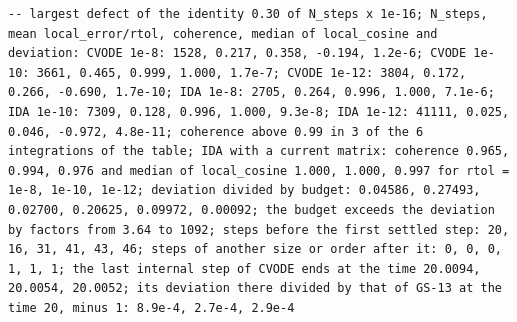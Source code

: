 \documentclass[
  10pt,
]{article}
\begin{document}
\begin{verbatim}
-- largest defect of the identity 0.30 of N_steps x 1e-16; N_steps, mean local_error/rtol, coherence, median of local_cosine and deviation: CVODE 1e-8: 1528, 0.217, 0.358, -0.194, 1.2e-6; CVODE 1e-10: 3661, 0.465, 0.999, 1.000, 1.7e-7; CVODE 1e-12: 3804, 0.172, 0.266, -0.690, 1.7e-10; IDA 1e-8: 2705, 0.264, 0.996, 1.000, 7.1e-6; IDA 1e-10: 7309, 0.128, 0.996, 1.000, 9.3e-8; IDA 1e-12: 41111, 0.025, 0.046, -0.972, 4.8e-11; coherence above 0.99 in 3 of the 6 integrations of the table; IDA with a current matrix: coherence 0.965, 0.994, 0.976 and median of local_cosine 1.000, 1.000, 0.997 for rtol = 1e-8, 1e-10, 1e-12; deviation divided by budget: 0.04586, 0.27493, 0.02700, 0.20625, 0.09972, 0.00092; the budget exceeds the deviation by factors from 3.64 to 1092; steps before the first settled step: 20, 16, 31, 41, 43, 46; steps of another size or order after it: 0, 0, 0, 1, 1, 1; the last internal step of CVODE ends at the time 20.0094, 20.0054, 20.0052; its deviation there divided by that of GS-13 at the time 20, minus 1: 8.9e-4, 2.7e-4, 2.9e-4

\end{verbatim}
\end{document}
